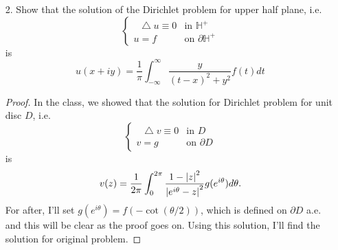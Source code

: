 \documentclass{article}
\newcommand*\Laplace{\mathop{}\!\mathbin\bigtriangleup}
\begin{document}
\begin{enumerate}
\begin{proof}
\begin{enumerate}
(1): Suppose $v$ is not subharmonic, so there exists a harmonic function $u$ such that $v-u$ has a local maximum inside the region $\Omega'$, which is the domain of $u$. Let the point $p$. Take an small enough open disc $D$ centered at the local maximum with radius $r>0$. Since $p$ is local maximum, $0<\delta=(v-u)(p)-\max\limits_{z\in \partial D} (v-u)(z)$, and take $\epsilon=\frac{\delta}{8(\norm{p}^2+r^2)}$, where $\norm{p}$ is the distance between $p$ and $0$ in $\mathbb{C}$. Then, $0<(v+\epsilon x^2-u)(p)-\max\limits_{z\in \partial D} (v+\epsilon x^2-u)(z)$ since $\epsilon$ is small enough, and there still exists local maximum of $(v+\epsilon x^2-u)$ in $D$, which is contradiction since $(v+\epsilon x^2-u)$ does not have local maximum in the $\Omega'$. Therefore, $v$ is subharmonic.
\end{enumerate}
\end{proof}
\item[2.] Show that the solution of the Dirichlet problem for upper half plane, i.e.
\begin{equation*}
\begin{cases}
\Laplace u\equiv 0 & \text{in }\mathbb{H}^+ \\
u=f & \text{on }\partial \mathbb{H}^+
\end{cases}
\end{equation*}
is
\begin{equation*}
u(x+iy)=\frac{1}{\pi}\int_{-\infty}^\infty \frac{y}{(t-x)^2+y^2}f(t)dt
\end{equation*}
\begin{proof}
In the class, we showed that the solution for Dirichlet problem for unit disc $D$, i.e.
\begin{equation*}
\begin{cases}
\Laplace v\equiv 0 & \text{in } D \\
v=g & \text{on }\partial D
\end{cases}
\end{equation*}
is
\begin{equation*}
v(z)=\frac{1}{2\pi}\int_0^{2\pi}\frac{1-\abs{z}^2}{\abs{e^{i\theta}-z}^2}g(e^{i\theta})d\theta.
\end{equation*}
For after, I'll set $g(e^{i\theta})=f(-\cot(\theta/2))$, which is defined on $\partial D$ a.e. and this will be clear as the proof goes on. Using this solution, I'll find the solution for original problem.


\end{proof}
\end{enumerate}
\end{document}
